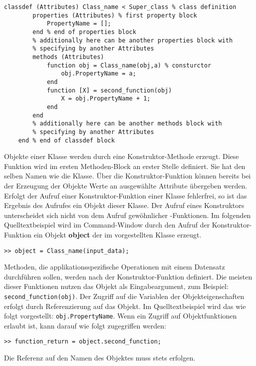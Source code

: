 \begin{lstlisting}[float=h!,caption={Beispiel Klassendefinition},label={Klassendefinition}, frame=none]
	classdef (Attributes) Class_name < Super_class % class definition
		properties (Attributes) % first property block
			PropertyName = [];
		end % end of properties block
		% additionally here can be another properties block with 
		% specifying by another Attributes
		methods (Attributes) 
			function obj = Class_name(obj,a) % consturctor
				obj.PropertyName = a;
			end
			function [X] = second_function(obj)
				X = obj.PropertyName + 1;
			end
		end
		% additionally here can be another methods block with 
		% specifying by another Attributes
	end % end of classdef block
\end{lstlisting}

Objekte einer Klasse werden durch eine Konstruktor-Methode erzeugt. Diese
Funktion wird im ersten Methoden-Block an erster Stelle definiert. Sie hat den
selben Namen wie die Klasse. \"Uber die Konstruktor-Funktion k\"onnen bereits
bei der Erzeugung der Objekte Werte an ausgew\"ahlte Attribute \"ubergeben
werden. Erfolgt der Aufruf einer Konstruktor-Funktion einer Klasse fehlerfrei,
so ist das Ergebnis des Aufrufes ein Objekt dieser Klasse. Der Aufruf eines
Konstruktors unterscheidet sich nicht von dem Aufruf gew\"ohnlicher
\matlab-Funktionen. Im folgenden Quelltextbeispiel wird im Command-Window durch
den Aufruf der Konstruktor-Funktion ein Objekt \textbf{object} der im
 vorgestellten Klasse erzeugt.
\begin{lstlisting}[frame=none]
	>> object = Class_name(input_data);
\end{lstlisting}

Methoden, die applikationsspezifische Operationen mit einem Datensatz
durchf\"uhren sollen, werden nach der Konstruktor-Funktion definiert.  Die
meisten dieser Funktionen nutzen das Objekt als Eingabeargument, zum Beispiel:
\lstinline{second_function(obj)}. Der Zugriff auf die Variablen der
Objekteigenschaften erfolgt durch Referenzierung auf das Objekt. Im
Quelltextbeispiel  wird das wie folgt vorgestellt:
\lstinline{obj.PropertyName}. Wenn ein Zugriff auf Objektfunktionen erlaubt ist,
kann darauf wie folgt zugegriffen werden:

\begin{lstlisting}[frame=none]
	>> function_return = object.second_function;
\end{lstlisting}
\noindent Die Referenz auf den Namen des Objektes muss stets erfolgen.

